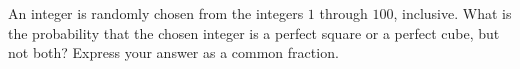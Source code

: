 An integer is randomly chosen from the integers $1$ through $100$, inclusive. What is the probability that the chosen integer is a perfect square or a perfect cube, but not both? Express your answer as a common fraction.
